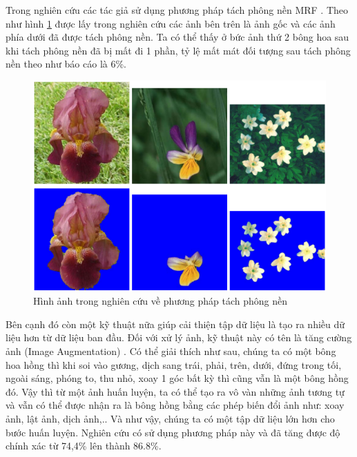 \documentclass[12pt]{report}
\begin{document}
		Trong nghiên cứu \cite{cia-Nilsback06} \cite{cia-Nilsback08} các tác giả sử dụng 
		phương pháp tách phông nền MRF \cite{cia_MRF}. Theo như hình \ref{fig:anh_tach_phong_nen} được lấy trong nghiên cứu \cite{cia-Nilsback06} các ảnh bên trên là ảnh gốc và các ảnh phía dưới đã được tách phông nền. Ta có thể thấy ở bức ảnh thứ 2 bông hoa sau khi tách phông nền đã bị mất đi 1 phần, tỷ lệ mất mát đối tượng sau tách phông nền theo như báo cáo là 6\%.
																																																		
		\begin{figure}[h]
			\centering
			\includegraphics[scale=0.6]{anh_tach_phong_nen}
			\caption{Hình ảnh trong nghiên cứu \cite{cia-Nilsback06} về phương pháp tách phông nền}
			\label{fig:anh_tach_phong_nen}
		\end{figure}
																																																		
		Bên cạnh đó còn một kỹ thuật nữa giúp cải thiện tập dữ liệu 
		là tạo ra nhiều dữ liệu hơn từ dữ liệu ban đầu. Đối với xử lý ảnh, kỹ thuật này có tên là tăng cường ảnh (Image Augmentation) \cite{cia_image_augmentation_1} \cite{cia_image_augmentation_2}. 
		Có thể giải thích như sau, chúng ta có một bông hoa hồng thì khi soi vào gương, dịch sang trái, phải, trên, dưới, đứng trong tối, ngoài sáng, phóng to, thu nhỏ, xoay 1 góc bất kỳ thì 
		cũng vẫn là một bông hồng đó. Vậy thì từ một ảnh huấn luyện, ta có thể tạo ra vô vàn 
		những ảnh tương tự và vẫn có thể được nhận ra là bông hồng bằng các phép biến đổi ảnh như: xoay ảnh, lật ảnh, dịch ảnh,.. Và như vậy, chúng ta có một tập dữ liệu lớn hơn cho bước huấn luyện. Nghiên cứu \cite{cia-CNNFeatures off-the-shelf} có sử dụng phương pháp này và đã tăng được độ chính xác từ 74,4\% lên thành 86.8\%.
																																																		
\end{document}
